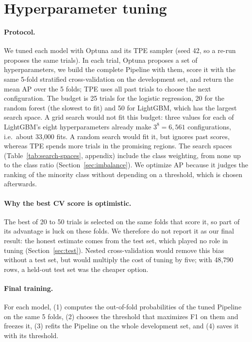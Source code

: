 \section{Hyperparameter tuning}
\label{sec:tuning}

\paragraph{Protocol.} We tuned each model with Optuna and its TPE sampler
(seed 42, so a re-run proposes the same trials). In each trial, Optuna proposes
a set of hyperparameters, we build the complete Pipeline with them, score it
with the same 5-fold stratified cross-validation on the development set, and
return the mean AP over the 5 folds; TPE uses all past trials to choose the
next configuration. The budget is 25 trials for the logistic regression, 20 for
the random forest (the slowest to fit) and 50 for LightGBM, which has the
largest search space. A grid search would not fit this budget: three values for
each of LightGBM's eight hyperparameters already make $3^8 = 6{,}561$
configurations, i.e.\ about 33{,}000 fits. A random search would fit it, but
ignores past scores, whereas TPE spends more trials in the promising regions.
The search spaces (Table~\ref{tab:search-spaces}, appendix) include the class
weighting, from none up to the class ratio (Section~\ref{sec:imbalance}). We
optimize AP because it judges the ranking of the minority class without
depending on a threshold, which is chosen afterwards.

\paragraph{Why the best CV score is optimistic.} The best of 20 to 50 trials is
selected on the same folds that score it, so part of its advantage is luck on
these folds. We therefore do not report it as our final result: the honest
estimate comes from the test set, which played no role in tuning
(Section~\ref{sec:test}). Nested cross-validation would remove this bias
without a test set, but would multiply the cost of tuning by five; with
48{,}790 rows, a held-out test set was the cheaper option.

\paragraph{Final training.} For each model,  (1) computes the
out-of-fold probabilities of the tuned Pipeline on the same 5 folds,
(2) chooses the threshold that maximizes F1 on them and freezes it, (3) refits
the Pipeline on the whole development set, and (4) saves it with its
threshold.

